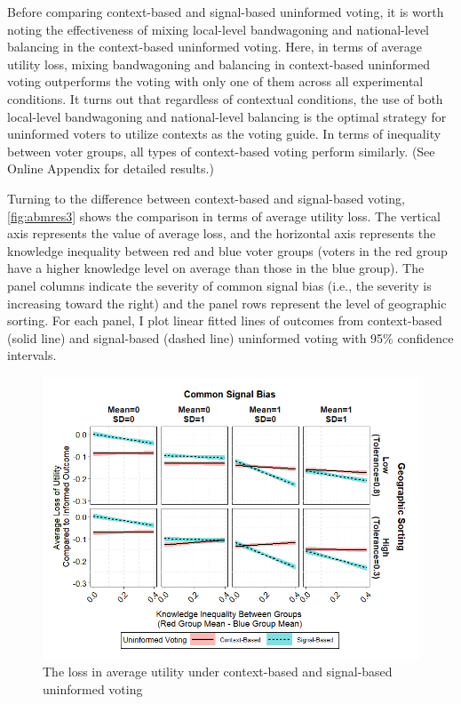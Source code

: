 \documentclass[letterpaper, 12pt]{article}
\begin{document}
    \par Before comparing context-based and signal-based uninformed voting, it is worth noting the effectiveness of mixing local-level bandwagoning and national-level balancing in the context-based uninformed voting. Here, in terms of average utility loss, mixing bandwagoning and balancing in context-based uninformed voting outperforms the voting with only one of them across all experimental conditions. It turns out that regardless of contextual conditions, the use of both local-level bandwagoning and national-level balancing is the optimal strategy for uninformed voters to utilize contexts as the voting guide. In terms of inequality between voter groups, all types of context-based voting perform similarly. (See Online Appendix for detailed results.)
    
    \par Turning to the difference between context-based and signal-based voting, \autoref{fig:abmres3} shows the comparison in terms of average utility loss. The vertical axis represents the value of average loss, and the horizontal axis represents the knowledge inequality between red and blue voter groups (voters in the red group have a higher knowledge level on average than those in the blue group). The panel columns indicate the severity of common signal bias (i.e., the severity is increasing toward the right) and the panel rows represent the level of geographic sorting. For each panel, I plot linear fitted lines of outcomes from context-based (solid line) and signal-based (dashed line) uninformed voting with 95\% confidence intervals. 
    
    \begin{figure}[t!]
        \caption{The loss in average utility under context-based and signal-based uninformed voting}
        \label{fig:abmres3}
        \includegraphics[width=\linewidth]{../outputs/abmres3.png}
    \end{figure}
\end{document}
